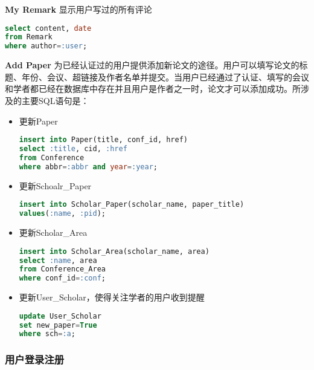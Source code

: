 {\bf My Remark} 显示用户写过的所有评论
\begin{lstlisting}[language=SQL]
select content, date
from Remark
where author=:user;
\end{lstlisting}
{\bf Add Paper} 为已经认证过的用户提供添加新论文的途径。用户可以填写论文的标题、年份、会议、超链接及作者名单并提交。当用户已经通过了认证、填写的会议和学者都已经在数据库中存在并且用户是作者之一时，论文才可以添加成功。所涉及的主要SQL语句是：
\begin{itemize}
\item 更新Paper
\begin{lstlisting}[language=SQL]
insert into Paper(title, conf_id, href)
select :title, cid, :href
from Conference
where abbr=:abbr and year=:year;
\end{lstlisting}
\item 更新Schoalr\_Paper
\begin{lstlisting}[language=SQL]
insert into Scholar_Paper(scholar_name, paper_title)
values(:name, :pid);
\end{lstlisting}
\item 更新Scholar\_Area
\begin{lstlisting}[language=SQL]
insert into Scholar_Area(scholar_name, area)
select :name, area
from Conference_Area
where conf_id=:conf;
\end{lstlisting}
\item 更新User\_Scholar，使得关注学者的用户收到提醒
\begin{lstlisting}[language=SQL]
update User_Scholar
set new_paper=True
where sch=:a;
\end{lstlisting}
\end{itemize}

\subsubsection{用户登录注册}


